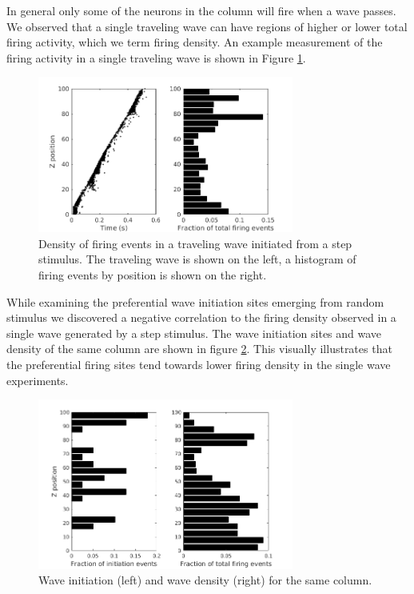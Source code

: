 \documentclass[a4paper,11pt]{article}
\begin{document}
In general only some of the neurons in the column will fire when a wave passes.
We observed that a single traveling wave can have regions of higher or lower total firing activity, which we term firing density.
An example measurement of the firing activity in a single traveling wave is shown in Figure \ref{fig:wave_density}.
\begin{figure}[!htb]
 \caption{Density of firing events in a traveling wave initiated from a step stimulus. The traveling wave is shown on the left, a histogram of firing events by position is shown on the right.}
 \label{fig:wave_density}
 \centering
   \includegraphics[width=0.75\textwidth]{fig/ImpulseWaveDensity}
\end{figure}

While examining the preferential wave initiation sites emerging from random stimulus we discovered a negative correlation to the firing density observed in a single wave generated by a step stimulus.
The wave initiation sites and wave density of the same column are shown in figure \ref{fig:initiation_density}.
This visually illustrates that the preferential firing sites tend towards lower firing density in the single wave experiments.
\begin{figure}[!htb]
 \caption{Wave initiation (left) and wave density (right) for the same column.}
 \label{fig:initiation_density}
 \centering
   \includegraphics[width=0.75\textwidth]{fig/InitiationCorrelationHistogram}
\end{figure}
\end{document}
